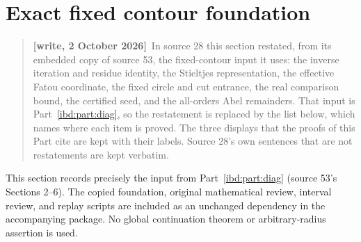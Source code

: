 \documentclass[11pt,letterpaper]{article}
\theoremstyle{remark}\newtheorem{remark}[theorem]{Remark}
\newenvironment{writenote}{\par\smallskip\begin{quote}\small\textbf{[write, 2 October 2026]}\ }{\end{quote}\smallskip}
\begin{document}
\section{Exact fixed contour foundation}\label{ibd:pd:sec:foundation}
\begin{writenote}In source 28 this section restated, from its embedded copy of source 53, the fixed-contour input it uses: the inverse iteration and residue identity, the Stieltjes representation, the effective Fatou coordinate, the fixed circle and cut entrance, the real comparison bound, the certified seed, and the all-orders Abel remainders. That input is Part~\ref{ibd:part:diag}, so the restatement is replaced by the list below, which names where each item is proved. The three displays that the proofs of this Part cite are kept with their labels. Source 28's own sentences that are not restatements are kept verbatim.\end{writenote}
This section records precisely the input from Part~\ref{ibd:part:diag} (source 53's Sections 2--6). The copied foundation, original mathematical review, interval review, and replay scripts are included as an unchanged dependency in the accompanying package. No global continuation theorem or arbitrary-radius assertion is used.
\end{document}
